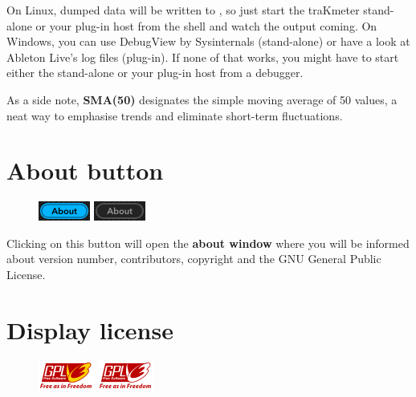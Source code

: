 On Linux, dumped data will be written to , so just start
the traKmeter stand-alone or your plug-in host from the shell and
watch the output coming.  On Windows, you can use DebugView by
Sysinternals (stand-alone) or have a look at Ableton Live's log files
(plug-in).  If none of that works, you might have to start either the
stand-alone or your plug-in host from a debugger.

As a side note, \textbf{SMA(50)} designates the simple moving average
of \num{50} values, a neat way to emphasise trends and eliminate
short-term fluctuations.

\section{About button}

\begin{figure}
  \includegraphics[scale=\screenshotscale,clip]{include/images/button_about_on.png}
  \newline \vspace{-0.9\baselineskip}
  \includegraphics[scale=\screenshotscale,clip]{include/images/button_about_off.png}
\end{figure}

Clicking on this button will open the \textbf{about window} where you
will be informed about version number, contributors, copyright and the
GNU General Public License.

\section{Display license}

\begin{figure}
  \includegraphics[scale=\screenshotscale,clip]{include/images/button_gpl_on.png}
  \newline \vspace{-0.9\baselineskip}
  \includegraphics[scale=\screenshotscale,clip]{include/images/button_gpl_off.png}
\end{figure}

